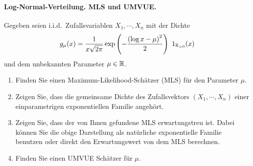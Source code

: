 \paragraph{Log-Normal-Verteilung. MLS und UMVUE. }
Gegeben seien i.i.d.\ Zufallsvariablen $X_1, \cdots, X_n$  mit der Dichte
\begin{equation*}
    g_{\mu}(x) = \frac{1}{x \sqrt{2\pi}} \exp \left( - \frac{ \left( \log x - \mu \right)^2 }{2} \right) \ 1_{\mathbb R_{>0}}(x)
\end{equation*}
und dem unbekannten Parameter $\mu \in \mathbb R$. 
\begin{enumerate}
    \item Finden Sie einen Maximum-Likelihood-Schätzer (MLS) für den Parameter $\mu$. 
    \item Zeigen Sie, dass die gemeinsame Dichte des Zufallsvektors $\left(
        X_1, \cdots, X_n \right)$ einer einparametrigen exponentiellen Familie
        angehört. 
    \item Zeigen Sie, dass der von Ihnen gefundene MLS erwartungstreu ist.
        Dabei können Sie die obige Darstellung als natürliche exponentielle
        Familie benutzen oder direkt den Erwartungswert von dem MLS berechnen. 
    \item Finden Sie einen UMVUE Schätzer für $\mu$. 
\end{enumerate}

